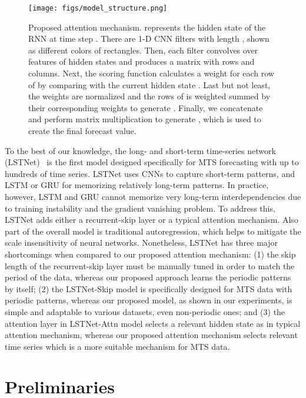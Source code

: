 \begin{figure*}[t]
    \centering
    \texttt{[image: figs/model\_structure.png]}
    \caption{Proposed attention mechanism.  represents the hidden state of the RNN at time step . There are  1-D CNN filters with length , shown as different colors of rectangles. Then, each filter convolves over  features of hidden states and produces a matrix  with  rows and  columns. Next, the scoring function calculates a weight for each row of  by comparing with the current hidden state . Last but not least, the weights are normalized and the rows of  is weighted summed by their corresponding weights to generate . Finally, we concatenate  and perform matrix multiplication to generate , which is used to create the final forecast value.}
    \label{fig:attention_structure}
\end{figure*}

To the best of our knowledge, the long- and short-term time-series network (LSTNet)~\cite{LSTNet} is the first model designed specifically for MTS forecasting with up to hundreds of time series.
LSTNet uses CNNs to capture short-term patterns, and LSTM or GRU for memorizing relatively long-term patterns.
In practice, however, LSTM and GRU cannot memorize very long-term interdependencies due to training instability and the gradient vanishing problem.
To address this, LSTNet adds either a recurrent-skip layer or a typical attention mechanism.
Also part of the overall model is traditional autoregression, which helps to mitigate the scale insensitivity of neural networks.
Nonetheless, LSTNet has three major shortcomings when compared to our proposed attention mechanism:
(1) the skip length of the recurrent-skip layer must be manually tuned in order to match the period of the data, whereas our proposed approach learns the periodic patterns by itself;
(2) the LSTNet-Skip model is specifically designed for MTS data with periodic patterns, whereas our proposed model, as shown in our experiments, is simple and adaptable to various datasets, even non-periodic ones; and
(3) the attention layer in LSTNet-Attn model selects a relevant hidden state as in typical attention mechanism, whereas our proposed attention mechanism selects relevant time series which is a more suitable mechanism for MTS data.

\section{Preliminaries}\label{sec:preliminaries}

